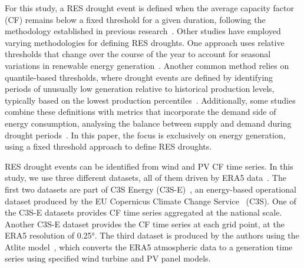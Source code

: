 \documentclass[a4paper, 11pt]{article}
\begin{document}
For this study, a RES drought event is defined when the average capacity factor (CF) remains below a fixed threshold for a given duration, following the methodology established in previous research~\cite{kaspar2019drought, ohba2022drought, mockert2023drought, mayer2023drought}. Other studies have employed varying methodologies for defining RES droughts. One approach uses relative thresholds that change over the course of the year to account for seasonal variations in renewable energy generation~\cite{raynaud2018drought, rinaldi2021drought, gangopadhyay2022drought, allen2023drought, kapica2024drought}. Another common method relies on quantile-based thresholds, where drought events are defined by identifying periods of unusually low generation relative to historical production levels, typically based on the lowest production percentiles~\cite{bracken2024drought, allen2023drought}. Additionally, some studies combine these definitions with metrics that incorporate the demand side of energy consumption, analysing the balance between supply and demand during drought periods~\cite{raynaud2018drought, rinaldi2021drought, allen2023drought, bracken2024drought}. In this paper, the focus is exclusively on energy generation, using a fixed threshold approach to define RES droughts. 

RES drought events can be identified from wind and PV CF time series. In this study, we use three different datasets, all of them driven by ERA5 data~\cite{hersbach2020era5}. The first two datasets are part of C3S Energy (C3S-E)~\cite{cds2023energy}, an energy-based operational dataset produced by the EU Copernicus Climate Change Service~\cite{dubus2023energy} (C3S). One of the C3S-E datasets provides CF time series aggregated at the national scale. Another C3S-E dataset provides the CF time series at each grid point, at the ERA5 resolution of 0.25°. The third dataset is produced by the authors using the Atlite model~\cite{hofman2021atlite}, which converts the  ERA5 atmospheric data to a generation time series using specified wind turbine and PV panel models. 

\end{document}
